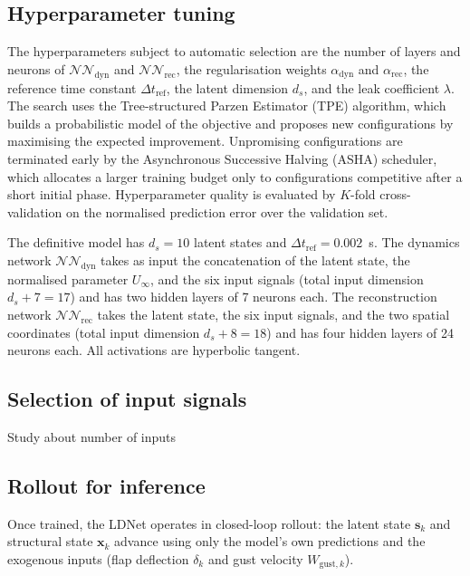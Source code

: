\subsection{Hyperparameter tuning}

The hyperparameters subject to automatic selection are the number of layers and neurons
of $\mathcal{NN}_\mathrm{dyn}$ and $\mathcal{NN}_\mathrm{rec}$, the regularisation weights
$\alpha_\mathrm{dyn}$ and $\alpha_\mathrm{rec}$, the reference time constant
$\Delta t_\mathrm{ref}$, the latent dimension $d_s$, and the leak coefficient $\lambda$.
The search uses the Tree-structured Parzen Estimator (TPE) algorithm, which builds a
probabilistic model of the objective and proposes new configurations by maximising the
expected improvement. Unpromising configurations are terminated early by the Asynchronous
Successive Halving (ASHA) scheduler, which allocates a larger training budget only to
configurations competitive after a short initial phase. Hyperparameter quality is evaluated
by $K$-fold cross-validation on the normalised prediction error over the validation set.

The definitive model has $d_s = 10$ latent states and $\Delta t_\mathrm{ref} = 0.002$~s.
The dynamics network $\mathcal{NN}_\mathrm{dyn}$ takes as input the concatenation of the
latent state, the normalised parameter $U_\infty$, and the six input signals (total
input dimension $d_s + 7 = 17$) and has two hidden layers of 7 neurons each. The
reconstruction network $\mathcal{NN}_\mathrm{rec}$ takes the latent state, the six input
signals, and the two spatial coordinates (total input dimension $d_s + 8 = 18$) and has
four hidden layers of 24 neurons each. All activations are hyperbolic tangent.

\subsection{Selection of input signals}

Study about number of inputs

\subsection{Rollout for inference}

Once trained, the LDNet operates in closed-loop rollout: the latent state $\mathbf{s}_k$
and structural state $\mathbf{x}_k$ advance using only the model's own predictions and
the exogenous inputs (flap deflection $\delta_k$ and gust velocity $W_{\mathrm{gust},k}$).

